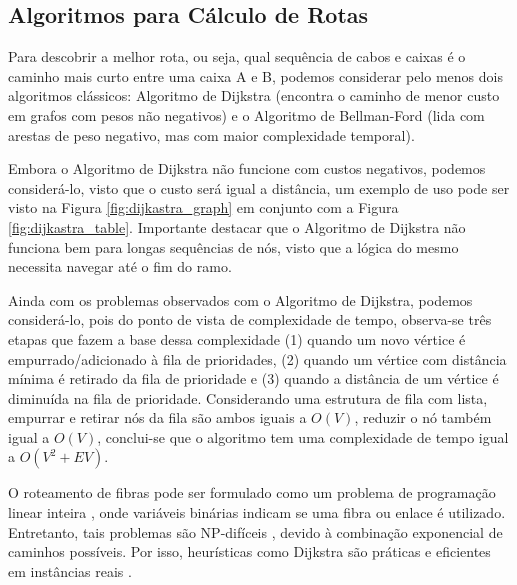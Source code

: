 \subsection{Algoritmos para Cálculo de Rotas}

Para descobrir a melhor rota, ou seja, qual sequência de cabos e caixas é o
caminho mais curto entre uma caixa A e B, podemos considerar pelo menos dois
algoritmos clássicos: Algoritmo de Dijkstra (encontra o caminho de menor custo
em grafos com pesos não negativos) \cite{dijkstra2022note} e o Algoritmo de
Bellman-Ford (lida com arestas de peso negativo, mas com maior complexidade
temporal).

Embora o Algoritmo de Dijkstra não funcione com custos negativos, podemos
considerá-lo, visto que o custo será igual a distância, um exemplo de uso pode
ser visto na Figura \ref{fig:dijkastra_graph} em conjunto com a Figura
\ref{fig:dijkastra_table}. Importante destacar que o Algoritmo de Dijkstra não
funciona bem para longas sequências de nós, visto que a lógica do mesmo
necessita navegar até o fim do ramo.

Ainda com os problemas observados com o Algoritmo de Dijkstra, podemos
considerá-lo, pois do ponto de vista de complexidade de tempo, observa-se três
etapas que fazem a base dessa complexidade (1) quando um novo vértice é
empurrado/adicionado à fila de prioridades, (2) quando um vértice com distância
mínima é retirado da fila de prioridade e (3) quando a distância de um vértice
é diminuída na fila de prioridade. Considerando uma estrutura de fila com lista,
empurrar e retirar nós da fila são ambos iguais a $O(V)$, reduzir o nó também
igual a $O(V)$, conclui-se que o algoritmo tem uma complexidade de tempo igual
a $O(V^2 + EV)$.

O roteamento de fibras pode ser formulado como um problema de programação
linear inteira \cite{griva2008linear}, onde variáveis binárias indicam se uma
fibra ou enlace é utilizado. Entretanto, tais problemas são NP-difíceis
\cite{artigorwa}, devido à combinação exponencial de caminhos possíveis. Por
isso, heurísticas como Dijkstra são práticas e eficientes em instâncias reais
\cite{mukherjee2020springer}.


